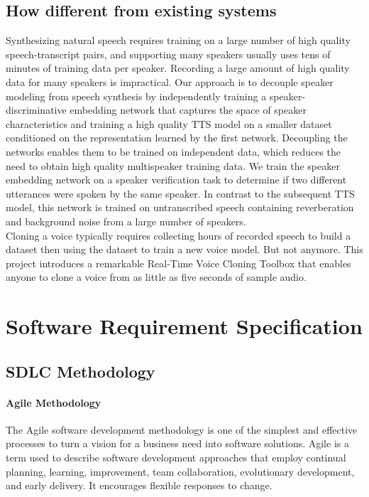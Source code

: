 \documentclass[12pt]{report}
\begin{document}
\section{How different from existing systems}
Synthesizing natural speech requires training on a large number of high quality speech-transcript
pairs, and supporting many speakers usually uses tens of minutes of training data per speaker.
Recording a large amount of high quality data for many speakers is impractical. Our approach is to
decouple speaker modeling from speech synthesis by independently training a speaker-discriminative
embedding network that captures the space of speaker characteristics and training a high quality TTS
model on a smaller dataset conditioned on the representation learned by the first network. Decoupling
the networks enables them to be trained on independent data, which reduces the need to obtain high
quality multispeaker training data. We train the speaker embedding network on a speaker verification
task to determine if two different utterances were spoken by the same speaker. In contrast to the
subsequent TTS model, this network is trained on untranscribed speech containing reverberation and
background noise from a large number of speakers.\\

Cloning a voice typically requires collecting hours of recorded speech to build a dataset then using the dataset to train a new voice model. But not anymore. This project introduces a remarkable Real-Time Voice Cloning Toolbox that enables anyone to clone a voice from as little as five seconds of sample audio.

\chapter{Software Requirement Specification}

\section{SDLC Methodology}
\subsubsection{Agile Methodology}
The Agile software development methodology is one of the simplest and effective processes to turn a vision for a business need into software solutions. Agile is a term used to describe software development approaches that employ continual planning, learning, improvement, team collaboration, evolutionary development, and early delivery. It encourages flexible responses to change.\\
\end{document}
